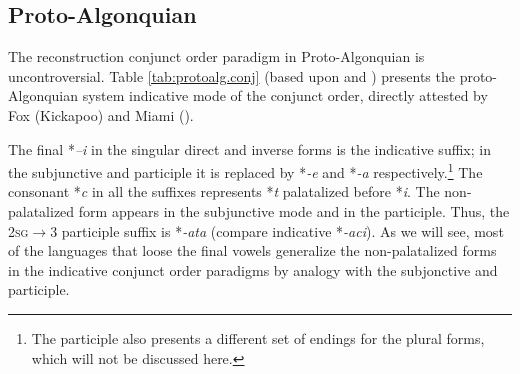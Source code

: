\documentclass[twoside,a4paper,11pt]{article}
\newcommand{\ipa}[1]{{\phon\textit{#1}}}
\newcommand{\Σ}{\greek{Σ}}
\begin{document}
\subsection{Proto-Algonquian}
The reconstruction conjunct order paradigm in Proto-Algonquian is uncontroversial. Table \ref{tab:protoalg.conj} (based upon \citealt{bloomfield46proto} and \citealt{goddard00cheyenne}) presents the proto-Algonquian system indicative mode of the conjunct order, directly attested by Fox (Kickapoo) and Miami (\citealt{costa03miami}).

The final *\ipa{--i} in the singular direct and inverse forms is the indicative suffix; in the subjunctive and participle it is replaced by *\ipa{-e} and *\ipa{-a} respectively.\footnote{The participle also presents a different set of endings for the plural forms, which will not be discussed here.} The consonant *\ipa{c} in all the suffixes represents *\ipa{t} palatalized before *\ipa{i}. The non-palatalized form appears in the subjunctive mode and in the participle. Thus, the \textsc{2sg$\rightarrow$3} participle suffix is *\ipa{-ata} (compare indicative *\ipa{-aci}). As we will see, most of the  languages that loose the final vowels generalize the non-palatalized forms in the indicative conjunct order paradigms by analogy with the subjonctive and participle.
\end{document}
